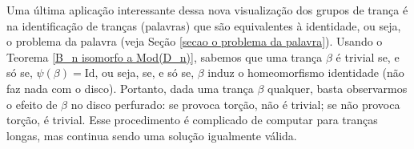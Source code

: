 	\par\vspace{0.3cm} Uma última aplicação interessante dessa nova visualização dos grupos de trança é na identificação de tranças (palavras) que são equivalentes à identidade, ou seja, o problema da palavra (veja Seção \ref{secao o problema da palavra}). Usando o Teorema \eqref{B_n isomorfo a Mod(D_n)}, sabemos que uma trança $\beta$ é trivial se, e só se, $\psi(\beta) = \text{Id}$, ou seja, se, e só se, $\beta$ induz o homeomorfismo identidade (não faz nada com o disco). Portanto, dada uma trança $\beta$ qualquer, basta observarmos o efeito de $\beta$ no disco perfurado: se provoca torção, não é trivial; se não provoca torção, é trivial. Esse procedimento é complicado de computar para tranças longas, mas continua sendo uma solução igualmente válida.